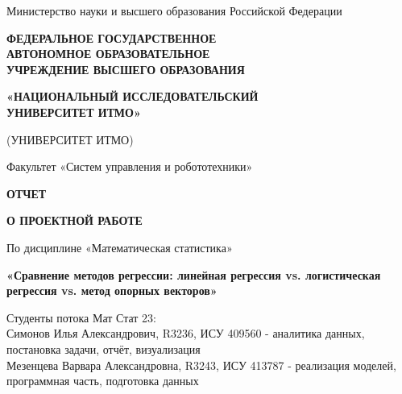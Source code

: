 \documentclass[a4paper]{article}
\begin{document}
\begin{titlepage}
    \centering
    \vspace*{1cm}
    
    Министерство науки и высшего образования Российской Федерации
    
    \vspace{0.5cm}
    
    {\large \textbf{ФЕДЕРАЛЬНОЕ ГОСУДАРСТВЕННОЕ}} \\
    {\large \textbf{АВТОНОМНОЕ ОБРАЗОВАТЕЛЬНОЕ}} \\
    {\large \textbf{УЧРЕЖДЕНИЕ ВЫСШЕГО ОБРАЗОВАНИЯ}}
    
    \vspace{0.5cm}
    
    {\large \textbf{«НАЦИОНАЛЬНЫЙ ИССЛЕДОВАТЕЛЬСКИЙ}} \\
    {\large \textbf{УНИВЕРСИТЕТ ИТМО»}}
    
    \vspace{0.5cm}
    
    {\large (УНИВЕРСИТЕТ ИТМО)}
    
    \vspace{1.5cm}
    
    Факультет «Систем управления и робототехники»
    
    \vspace{2cm}
    
    {\large \textbf{ОТЧЕТ}}
    
    \vspace{0.5cm}
    
    {\large \textbf{О ПРОЕКТНОЙ РАБОТЕ}}
    
    \vspace{0.5cm}
    
    По дисциплине «Математическая статистика»
    \vspace{0.5cm}

    {\large \textbf{«Сравнение методов регрессии: линейная регрессия vs. логистическая регрессия vs. метод опорных векторов»}}
    
    \vspace{2cm}
    
    \begin{flushleft}
        Студенты потока Мат Стат 23: \\
        Симонов Илья Александрович, R3236, ИСУ 409560 - аналитика данных, постановка задачи, отчёт, визуализация\\
        Мезенцева Варвара Александровна, R3243, ИСУ 413787 - реализация моделей, программная часть, подготовка данных       
    \end{flushleft}
    

\end{titlepage}
\end{document}

